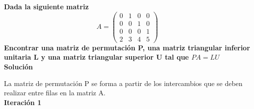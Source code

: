 \textbf{Dada la siguiente matriz}
\[ A =
    \left( \begin{array}{cccc}
    0 & 1 & 0 & 0\\
    0 & 0 & 1 & 0\\ 
    0 & 0 & 0 & 1\\ 
    2 & 3 & 4 & 5
    \end{array} \right) 
\]
\textbf{Encontrar una matriz de permutación P, una matriz triangular inferior unitaria L y una matriz triangular superior U tal que $PA = LU$} \\

\textbf{Solución}

La matriz de permutación P se forma a partir de los intercambios que se deben realizar entre filas  en la matriz A.\\

\textbf{Iteración 1}\\

